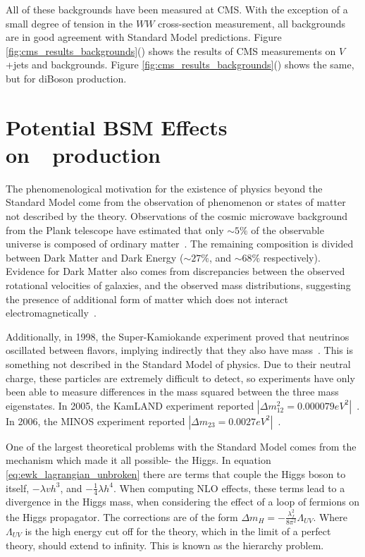 \par All of these backgrounds have been measured at CMS.  With the
exception of a small degree of tension in the $WW$ cross-section
measurement, all backgrounds are in good agreement with Standard Model
predictions.  Figure
\ref{fig:cms_results_backgrounds}()
shows the results of CMS measurements on $V$+jets and \ttjets
backgrounds.  Figure
\ref{fig:cms_results_backgrounds}() shows
the same, but for diBoson production.  
 

\section{Potential BSM Effects on~\ttH~production}
\label{bsm_effects_overview}

\par The phenomenological motivation for the existence of physics beyond
the Standard Model come from the observation of phenomenon or states
of matter not described by the theory.  Observations of the cosmic microwave background
from the Plank telescope have estimated that only $\sim5\%$ of the
observable universe is composed of ordinary
matter~\cite{BSM_Planck}. The remaining composition is divided between  
Dark Matter and Dark Energy ($\sim27\%$, and $\sim68\%$ respectively).  Evidence for
Dark Matter also comes from discrepancies between the observed
rotational velocities of galaxies, and the observed mass
distributions, suggesting the presence of additional form of matter
which does not interact
electromagnetically~\cite{BSM_Rubin_DM_GalaxyRotations}.

\par Additionally, in 1998, the Super-Kamiokande experiment proved that
neutrinos oscillated between flavors, implying indirectly that they
also have mass~\cite{BSM_superK}.  This is something not described in
the Standard Model of physics.  Due to their neutral charge, these
particles  are extremely difficult to detect, so experiments have only
been able to measure differences in the mass squared between the three
mass eigenstates.  In 2005, the KamLAND experiment reported
$|{\Delta}m^{2}_{12}=0.000079
eV^{2}|$~\cite{BSM_neutrinoDeltaM12_kamland}.  In 2006, the MINOS
experiment reported
$|{\Delta}m_{23}=0.0027 eV^{2}|$~\cite{BSM_neutrinoDeltaM23_minos}.

\par One of the largest theoretical problems with the Standard Model
comes from the mechanism which made it all possible- the Higgs.  In
equation \ref{eq:ewk_lagrangian_unbroken} there are terms that couple
the Higgs boson to itself, $-{\lambda}vh^{3}$, and
$-\frac{1}{4}{\lambda}h^{4}$.  When computing NLO effects, these terms
lead to a divergence in the Higgs mass, when considering the effect of
a loop of fermions on the Higgs propagator.  The corrections are of the form ${\Delta}m_{H} =
-\frac{\lambda_{f}^{2}}{8\pi^{2}}\Lambda_{UV}$.  Where $\Lambda_{UV}$
is the high energy cut off for the theory, which in the limit of a
perfect theory, should extend to infinity.  This is known as the
hierarchy problem.  

